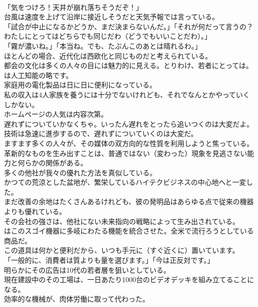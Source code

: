 \documentclass[8pt]{extreport}
\begin{document}
\begin{CJK}{UTF8}{min}
\\	「気をつけろ！天井が崩れ落ちそうだぞ！」
\\	台風は速度を上げて沿岸に接近しそうだと天気予報では言っている。
\\	「試合が中止になるかどうか、まだ決まらないんだ。」「それが何だって言うの？わたしにとってはどちらでも同じだわ（どうでもいいことだわ）。」
\\	「霧が濃いね。」「本当ね。でも、たぶんこのあとは晴れるわ。」
\\	ほとんどの場合、近代化は西欧化と同じものだと考えられている。
\\	都会の文化は多くの人々の目には魅力的に見える。とりわけ、若者にとっては。
\\	は人工知能の略です。
\\	家庭用の電化製品は日に日に便利になっている。
\\	私の収入は4人家族を養うには十分でないけれども、それでなんとかやっていくしかない。
\\	ホームページの人気は内容次第。
\\	遅れずについていかなくちゃ。いったん遅れをとったら追いつくのは大変だよ。
\\	技術は急速に進歩するので、遅れずについていくのは大変だ。
\\	ますます多くの人々が、その媒体の双方向的な性質を利用しようと焦っている。
\\	革新的なものを生み出すことは、普通ではない（変わった）現象を見逃さない能力と何らかの関係がある。
\\	多くの他社が我々の優れた方法を真似している。
\\	かつての荒涼とした盆地が、繁栄しているハイテクビジネスの中心地へと一変した。
\\	まだ改善の余地はたくさんあるけれども、彼の発明品はあらゆる点で従来の機器よりも優れている。
\\	その会社の強さは、他社にない未来指向の戦略によって生み出されている。
\\	はこのスゴイ機器に多岐にわたる機能を統合させた。全米で流行ろうとしている商品だ。
\\	この道具は何かと便利だから、いつも手元に（すぐ近くに）置いています。
\\	「一般的に、消費者は質よりも量を選びます。」「今は正反対です。」
\\	明らかにその広告は10代の若者層を狙いとしている。
\\	現在建設中のその工場は、一日あたり1000台のビデオデッキを組み立てることになる。
\\	効率的な機械が、肉体労働に取って代わった。

\end{CJK}
\end{document}
